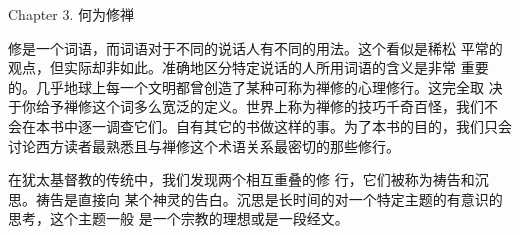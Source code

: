 


\beginchapter Chapter 3. 何为修禅


{
\parindent=3pc
\noindent\hang{}
\1%
{修是一个词语}，而词语对于不同的说话人有不同的用法。这个看似是稀松
平常的观点，但实际却非如此。准确地区分特定说话的人所用词语的含义是非常
重要的。几乎地球上每一个文明都曾创造了某种可称为禅修的心理修行。这完全取
决于你给予禅修这个词多么宽泛的定义。世界上称为禅修的技巧千奇百怪，我们不
会在本书中逐一调查它们。自有其它的书做这样的事。为了本书的目的，我们只会
讨论西方读者最熟悉且与禅修这个术语关系最密切的那些修行。

}

在犹太基督教的传统中，我们发现两个相互重叠的修
行，它们被称为祷告和沉思。祷告是直接向
某个神灵的告白。沉思是长时间的对一个特定主题的有意识的思考，这个主题一般
是一个宗教的理想或是一段经文。


\endchapter

\byebye
